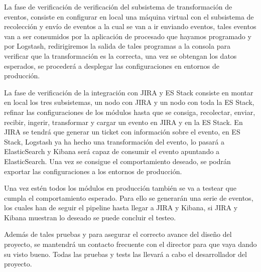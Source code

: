 La fase de verificación de verificación del subsistema de transformación de eventos, consiste en configurar en local una máquina virtual con el subsistema de recolección y envío de eventos a la cual se van a ir enviando eventos, tales eventos van a ser consumidos por la aplicación de procesado que hayamos programado y por Logstash, redirigiremos la salida de tales programas a la consola para verificar que la transformación es la correcta, una vez se obtengan los datos esperados, se procederá a desplegar las configuraciones en entornos de producción.

La fase de verificación de la integración con JIRA y ES Stack consiste en montar en local los tres subsistemas, un nodo con JIRA y un nodo con toda la ES Stack, refinar las configuraciones de los módulos hasta que se consiga, recolectar, enviar, recibir, ingerir, transformar y cargar un evento en JIRA y en la ES Stack. En JIRA se tendrá que generar un ticket con información sobre el evento, en ES Stack, Logstash ya ha hecho una transformación del evento, lo pasará a ElasticSearch y Kibana será capaz de consumir el evento apuntando a ElasticSearch. Una vez se consigue el comportamiento deseado, se podrán exportar las configuraciones a los entornos de producción.

Una vez estén todos los módulos en producción también se va a testear que cumpla el comportamiento esperado. Para ello se generarán una serie de eventos, los cuales han de seguir el pipeline hasta llegar a JIRA y Kibana, si JIRA y Kibana muestran lo deseado se puede concluir el testeo.

Además de tales pruebas y para asegurar el correcto avance del diseño del proyecto, se mantendrá un contacto frecuente con el director para que vaya dando su visto bueno. Todas las pruebas y tests las llevará a cabo el desarrollador del proyecto.